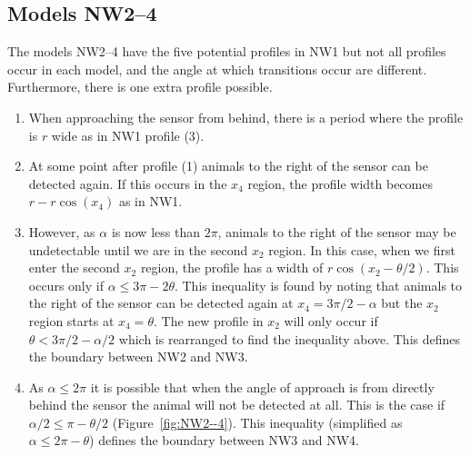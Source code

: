 \subsection{Models NW2--4} \label{NW2--4}
The models NW2--4 have the five potential profiles in NW1 but not all profiles occur in each model, and the angle at which transitions occur are different.
Furthermore, there is one extra profile possible.
\begin{enumerate}
\item When approaching the sensor from behind, there is a period where the profile is $r$ wide as in NW1 profile (3).
\item At some point after profile (1) animals to the right of the sensor can be detected again.
If this occurs in the $x_4$ region, the profile width becomes  $r - r\cos(x_4)$ as in NW1.
\item However, as $\alpha$ is now less than $2\pi$, animals to the right of the sensor may be undetectable until we are in the second $x_2$ region.
In this case, when we first enter the second $x_2$ region, the profile has a width of $r\cos(x_2 - \theta/2)$.
This occurs only if $\alpha \le 3\pi - 2\theta$.
This inequality is found by noting that animals to the right of the sensor can be detected again at $x_4 = 3\pi/2 - \alpha$ but the $x_2$ region starts at $x_4 = \theta$.
The new profile in $x_2$ will only occur if  $ \theta < 3\pi/2 - \alpha/2$ which is rearranged to find the inequality above.
This defines the boundary between NW2 and NW3.
\item As $\alpha \le 2\pi$ it is possible that when the angle of approach is from directly behind the sensor the animal will not be detected at all.
This is the case if $\alpha/2\le \pi-\theta/2$ (Figure~\ref{fig:NW2--4}).
This inequality (simplified as $\alpha\le 2\pi-\theta$) defines the boundary between NW3 and NW4.
\end{enumerate}



